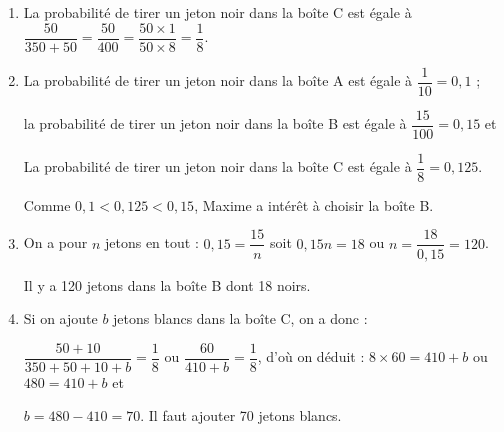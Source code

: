 
\medskip

%
%
%
%
%
%

\begin{enumerate}
\item %
La probabilité de tirer un jeton noir dans la boîte C est égale à $\dfrac{50}{350 + 50} = \dfrac{50}{400}= \dfrac{50 \times 1}{50 \times 8} = \dfrac{1}{8}$.
\item %
La probabilité de tirer un jeton noir dans la boîte A est égale à $\dfrac{1}{10} = 0,1$ ;

la probabilité de tirer un jeton noir dans la boîte B est égale à $\dfrac{15}{100} = 0,15$ et 

La probabilité de tirer un jeton noir dans la boîte C est égale à $\dfrac{1}{8} = 0,125$.

Comme $0,1 < 0,125 < 0,15$, Maxime a intérêt à choisir la boîte B.
\item %
On a pour $n$ jetons en tout : $0,15 = \dfrac{15}{n}$ soit $0,15n = 18$ ou $n = \dfrac{18}{0,15} = 120$.

Il y a 120 jetons dans la boîte B dont 18 noirs. 
\item  %
Si on ajoute $b$ jetons blancs dans la boîte C, on a donc :

$\dfrac{50 + 10}{350 + 50 + 10 + b} = \dfrac{1}{8}$ ou $\dfrac{60}{410 + b} = \dfrac{1}{8}$, d'où on déduit : $8 \times 60 = 410 + b$ ou $480 = 410 + b$ et 

$b = 480 - 410 = 70$. Il faut ajouter 70 jetons blancs.
\end{enumerate}

\bigskip


